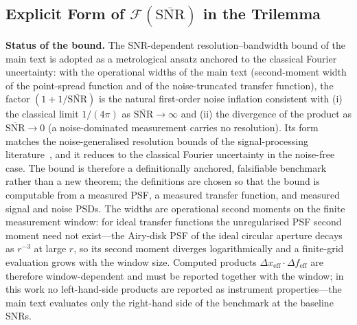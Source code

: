\documentclass[review,12pt]{elsarticle}
\begin{document}
\subsection{Explicit Form of $\mathcal{F}(\overline{\mathrm{SNR}})$ in the Trilemma}
\label{S4.3}

\textbf{Status of the bound.} The SNR-dependent resolution--bandwidth bound of the main text is adopted as a metrological ansatz anchored to the classical Fourier uncertainty: with the operational widths of the main text (second-moment width of the point-spread function and of the noise-truncated transfer function), the factor $(1+1/\overline{\mathrm{SNR}})$ is the natural first-order noise inflation consistent with (i) the classical limit $1/(4\pi)$ as $\overline{\mathrm{SNR}}\to\infty$ and (ii) the divergence of the product as $\overline{\mathrm{SNR}}\to0$ (a noise-dominated measurement carries no resolution). Its form matches the noise-generalised resolution bounds of the signal-processing literature~\cite{greco2019angular}, and it reduces to the classical Fourier uncertainty in the noise-free case. The bound is therefore a definitionally anchored, falsifiable benchmark rather than a new theorem; the definitions are chosen so that the bound is computable from a measured PSF, a measured transfer function, and measured signal and noise PSDs. The widths are operational second moments on the finite measurement window: for ideal transfer functions the unregularised PSF second moment need not exist---the Airy-disk PSF of the ideal circular aperture decays as $r^{-3}$ at large $r$, so its second moment diverges logarithmically and a finite-grid evaluation grows with the window size. Computed products $\Delta x_\mathrm{eff}\cdot\Delta f_\mathrm{eff}$ are therefore window-dependent and must be reported together with the window; in this work no left-hand-side products are reported as instrument properties---the main text evaluates only the right-hand side of the benchmark at the baseline SNRs.
\end{document}
